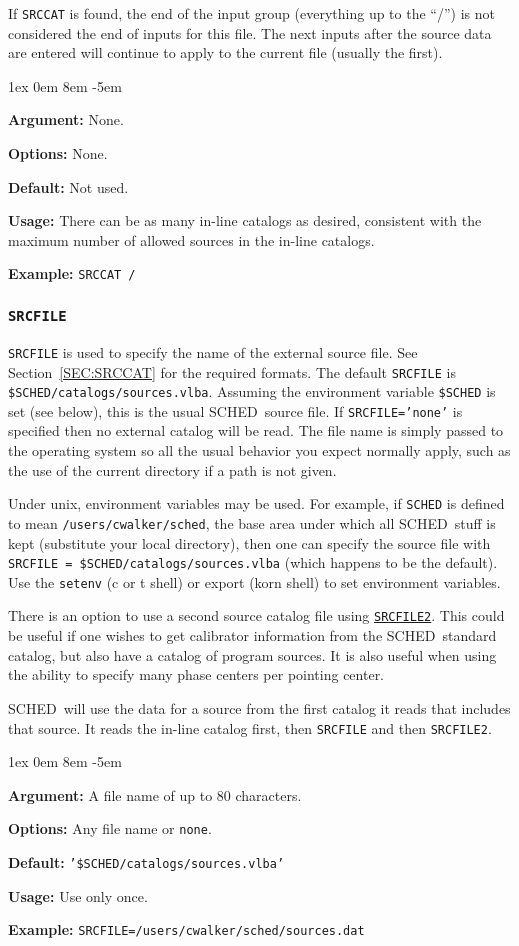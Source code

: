 \documentclass{report}
\newcommand{\schedb}{{\sc SCHED~}}
\newcommand{\rcwbox}[5]{
  \begin{list}{}{\parsep 1ex  \itemsep 0em
                 \leftmargin 8em  \itemindent -5em }
    \item {\bf Argument:} #1
    \item {\bf Options:}  #2
    \item {\bf Default:}  #3
    \item {\bf Usage:}    #4
    \item {\bf Example:}  #5
  \end{list}
}
\begin{document}
If {\tt SRCCAT}
is found, the end of the input group (everything up to the ``/'')
is not considered the end of inputs for this file.  The next inputs
after the source data are entered will continue to apply to the current
file (usually the first).

\rcwbox
{None.}
{None.}
{Not used.}
{There can be as many in-line catalogs as desired, consistent with
the maximum number of allowed sources in the in-line catalogs.}
{{\tt SRCCAT /}}


\subsubsection{\label{MP:SRCFILE}{\tt SRCFILE}}

{\tt SRCFILE} is used to specify the name of the external source
file. See Section~\ref{SEC:SRCCAT} for the required formats. The
default {\tt SRCFILE} is {\tt \$SCHED/catalogs/sources.vlba}.
Assuming the environment variable {\tt \$SCHED} is set (see below),
this is the usual \schedb source file.  If {\tt SRCFILE='none'} is
specified then no external catalog will be read.  The file name is
simply passed to the operating system so all the usual behavior you
expect normally apply, such as the use of the current directory if a
path is not given.

Under unix, environment variables may be used.  For example, if
{\tt SCHED} is defined to mean {\tt /users/cwalker/sched}, the
base area under which all \schedb stuff is kept (substitute your
local directory), then one can specify the source file with
{\tt SRCFILE = \$SCHED/catalogs/sources.vlba} (which happens to be
the default).  Use the {\tt setenv}
(c or t shell) or export (korn shell) to set environment variables.

There is an option to use a second source catalog file using
{\hyperref[MP:SRCFILE2]{{\tt SRCFILE2}}}.  This could be useful if one
wishes to get calibrator information from the \schedb standard
catalog, but also have a catalog of program sources.  It is also
useful when using the ability to specify many phase centers per
pointing center.

\schedb will use the data for a source from the first catalog it
reads that includes that source.  It reads the in-line catalog first,
then {\tt SRCFILE} and then {\tt SRCFILE2}.

\rcwbox
{A file name of up to 80 characters.}
{Any file name or {\tt none}.}
{{\tt '\$SCHED/catalogs/sources.vlba'}}
{Use only once.}
{{\tt SRCFILE=/users/cwalker/sched/sources.dat}}
\end{document}
